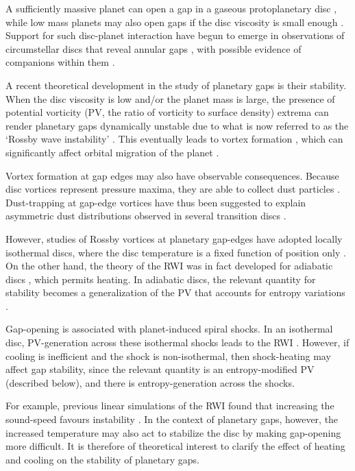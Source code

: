 \documentclass[useAMS,usenatbib]{mn2e}
\begin{document}
A sufficiently massive planet can open a gap in a 
gaseous protoplanetary disc \citep{pap_lin84,bryden99,crida06,fung14}, 
while low mass planets may also open gaps if the disc viscosity is
small enough \citep{li09,dong11,duffell13}. Support for such disc-planet
interaction have begun to emerge in observations of circumstellar
discs that reveal annular gaps
\citep[e.g.][]{quanz13a,debes13,osorio14}, with possible evidence of
companions within them \citep[e.g.][]{quanz13b,reggiani14}. 

A recent theoretical development in the study of planetary gaps is
their stability. When the disc viscosity is low and/or the planet mass
is large, the presence of potential vorticity (PV, the ratio of
vorticity to surface density) extrema can render planetary gaps
dynamically unstable due to what is now referred to as the `Rossby
wave instability' \citep[RWI,][]{lovelace99,li00}. This 
eventually leads to vortex formation 
\citep{li01,koller03,li05,valborro07}, which can significantly affect
orbital migration of the planet  \citep{ou07,li09,yu10,lin10}. 

Vortex formation at gap edges may also have observable 
consequences. Because disc vortices represent pressure maxima, they are
able to collect dust particles 
\citep{barge95,inaba06,lyra13}. Dust-trapping at gap-edge vortices
have thus been suggested to explain asymmetric dust
distributions observed in several transition discs
\citep[e.g.][]{casassus13,marel13,isella13,fukagawa13,perez14,pinilla15}. 

However, studies of Rossby vortices at planetary gap-edges have 
adopted locally isothermal discs, 
where the disc temperature is a fixed function of
position only \citep[e.g.][]{lyra08,lin11a,zhu14,fu14}. On the other hand, the theory of the RWI was in fact
developed for adiabatic discs \citep{li00}, which permits
heating. 
In adiabatic discs, the relevant quantity for stability
becomes a generalization of the PV that accounts for entropy variations
\citep{lovelace99}.   


Gap-opening is associated with planet-induced spiral shocks. In an
isothermal disc, PV-generation across these isothermal shocks leads to
the RWI \citep{koller03,li05,valborro07,lin10}.    
However, if cooling is inefficient and the shock is non-isothermal,
then shock-heating may affect gap stability, since the
relevant quantity is an entropy-modified PV (described below), and
there is entropy-generation across the shocks. 

For example, previous
linear simulations of the RWI found  
that increasing the sound-speed favours instability \citep{li00,lin13}.  
In the context of
planetary gaps, however, the increased temperature may also act to
stabilize the disc by making gap-opening more difficult. It is 
therefore of theoretical interest to clarify the effect of heating and
cooling on the stability of planetary gaps. 
\end{document}
